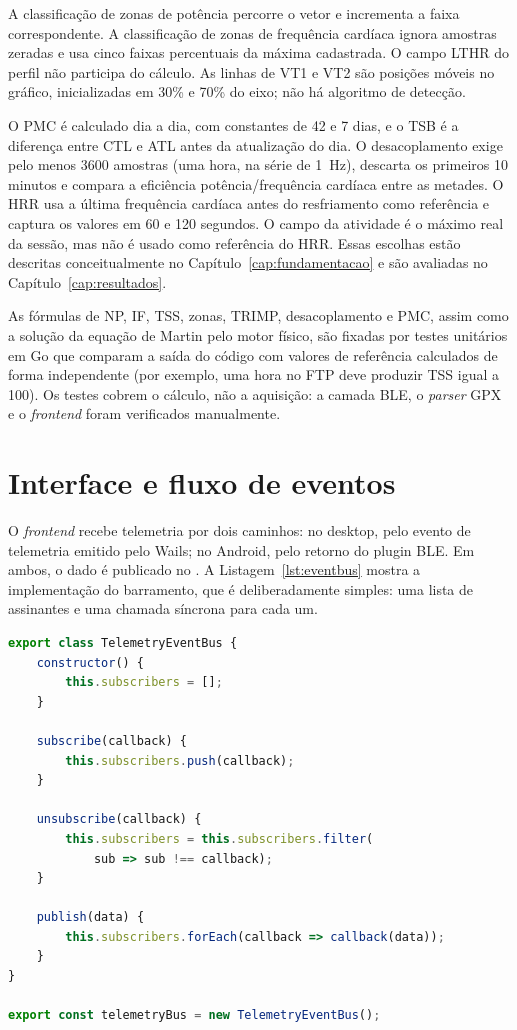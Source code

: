 A classificação de zonas de potência percorre o vetor e incrementa a faixa
correspondente. A classificação de zonas de frequência cardíaca ignora amostras
zeradas e usa cinco faixas percentuais da máxima cadastrada. O campo LTHR do
perfil não participa do cálculo. As linhas de VT1 e VT2 são posições móveis no
gráfico, inicializadas em 30\% e 70\% do eixo; não há algoritmo de detecção.

O PMC é calculado dia a dia, com constantes de 42 e 7 dias, e o TSB é a
diferença entre CTL e ATL antes da atualização do dia. O desacoplamento exige
pelo menos 3600 amostras (uma hora, na série de 1~Hz), descarta os primeiros
10 minutos e compara a
eficiência potência/frequência cardíaca entre as metades. O HRR usa a última
frequência cardíaca antes do resfriamento como referência e captura os valores
em 60 e 120 segundos. O campo  da atividade é o máximo real da
sessão, mas não é usado como referência do HRR. Essas escolhas estão descritas
conceitualmente no Capítulo~\ref{cap:fundamentacao} e são avaliadas no
Capítulo~\ref{cap:resultados}.

As fórmulas de NP, IF, TSS, zonas, TRIMP, desacoplamento e PMC, assim como a
solução da equação de Martin pelo motor físico, são fixadas por testes
unitários em Go que comparam a saída do código com valores de referência
calculados de forma independente (por exemplo, uma hora no FTP deve produzir
TSS igual a 100). Os testes cobrem o cálculo, não a aquisição: a camada BLE, o
\textit{parser} GPX e o \textit{frontend} foram verificados manualmente.

\section{Interface e fluxo de eventos}
\label{sec:implementacao-frontend}

O \textit{frontend} recebe telemetria por dois caminhos: no desktop, pelo evento
de telemetria emitido pelo Wails; no Android, pelo retorno do plugin BLE. Em
ambos, o dado é publicado no . A
Listagem~\ref{lst:eventbus} mostra a implementação do barramento, que é
deliberadamente simples: uma lista de assinantes e uma chamada síncrona para
cada um.

\begin{lstlisting}[language=JavaScript, float=htbp, caption={Barramento de telemetria do frontend}, label={lst:eventbus}]
export class TelemetryEventBus {
    constructor() {
        this.subscribers = [];
    }

    subscribe(callback) {
        this.subscribers.push(callback);
    }

    unsubscribe(callback) {
        this.subscribers = this.subscribers.filter(
            sub => sub !== callback);
    }

    publish(data) {
        this.subscribers.forEach(callback => callback(data));
    }
}

export const telemetryBus = new TelemetryEventBus();
\end{lstlisting}

